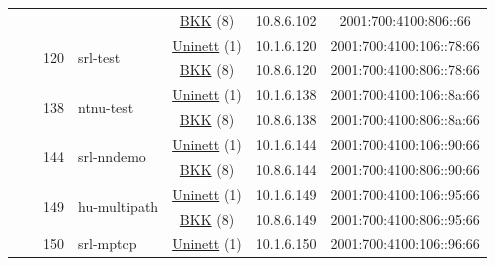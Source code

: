 \begin{small}
\begin{center}
\begin{longtable}{|c|c|c|c|c|c|c|c|}
  &  & \multicolumn{2}{|c|}{} & \multicolumn{2}{|c|}{\tiny{\href{http://bkk.no}{BKK} (8)}} & \tiny{10.8.6.102} & \tiny{2001:700:4100:806::66} \\* \cline{3-3}\cline{4-4}\cline{5-5}\cline{6-6}\cline{7-7}\cline{8-8}
  &  & \multirow{2}{*}{\tiny{120}} & \multicolumn{1}{|l|}{\multirow{2}{*}{\tiny{srl-test}}} & \multicolumn{2}{|c|}{\tiny{\href{https://www.uninett.no}{Uninett} (1)}} & \tiny{10.1.6.120} & \tiny{2001:700:4100:106::78:66} \\* \cline{5-5}\cline{6-6}\cline{7-7}\cline{8-8}
  &  &  &  & \multicolumn{2}{|c|}{\tiny{\href{http://bkk.no}{BKK} (8)}} & \tiny{10.8.6.120} & \tiny{2001:700:4100:806::78:66} \\* \cline{3-3}\cline{4-4}\cline{5-5}\cline{6-6}\cline{7-7}\cline{8-8}
  &  & \multirow{2}{*}{\tiny{138}} & \multicolumn{1}{|l|}{\multirow{2}{*}{\tiny{ntnu-test}}} & \multicolumn{2}{|c|}{\tiny{\href{https://www.uninett.no}{Uninett} (1)}} & \tiny{10.1.6.138} & \tiny{2001:700:4100:106::8a:66} \\* \cline{5-5}\cline{6-6}\cline{7-7}\cline{8-8}
  &  &  &  & \multicolumn{2}{|c|}{\tiny{\href{http://bkk.no}{BKK} (8)}} & \tiny{10.8.6.138} & \tiny{2001:700:4100:806::8a:66} \\* \cline{3-3}\cline{4-4}\cline{5-5}\cline{6-6}\cline{7-7}\cline{8-8}
  &  & \multirow{2}{*}{\tiny{144}} & \multicolumn{1}{|l|}{\multirow{2}{*}{\tiny{srl-nndemo}}} & \multicolumn{2}{|c|}{\tiny{\href{https://www.uninett.no}{Uninett} (1)}} & \tiny{10.1.6.144} & \tiny{2001:700:4100:106::90:66} \\* \cline{5-5}\cline{6-6}\cline{7-7}\cline{8-8}
  &  &  &  & \multicolumn{2}{|c|}{\tiny{\href{http://bkk.no}{BKK} (8)}} & \tiny{10.8.6.144} & \tiny{2001:700:4100:806::90:66} \\* \cline{3-3}\cline{4-4}\cline{5-5}\cline{6-6}\cline{7-7}\cline{8-8}
  &  & \multirow{2}{*}{\tiny{149}} & \multicolumn{1}{|l|}{\multirow{2}{*}{\tiny{hu-multipath}}} & \multicolumn{2}{|c|}{\tiny{\href{https://www.uninett.no}{Uninett} (1)}} & \tiny{10.1.6.149} & \tiny{2001:700:4100:106::95:66} \\* \cline{5-5}\cline{6-6}\cline{7-7}\cline{8-8}
  &  &  &  & \multicolumn{2}{|c|}{\tiny{\href{http://bkk.no}{BKK} (8)}} & \tiny{10.8.6.149} & \tiny{2001:700:4100:806::95:66} \\* \cline{3-3}\cline{4-4}\cline{5-5}\cline{6-6}\cline{7-7}\cline{8-8}
  &  & \multirow{2}{*}{\tiny{150}} & \multicolumn{1}{|l|}{\multirow{2}{*}{\tiny{srl-mptcp}}} & \multicolumn{2}{|c|}{\tiny{\href{https://www.uninett.no}{Uninett} (1)}} & \tiny{10.1.6.150} & \tiny{2001:700:4100:106::96:66} \\* \cline{5-5}\cline{6-6}\cline{7-7}\cline{8-8}

\end{longtable}
\end{center}
\end{small}
